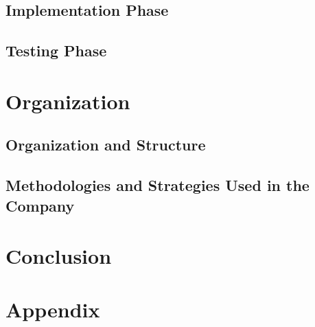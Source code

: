 \documentclass[12pt]{report}
\begin{document}
    \section{Implementation Phase}

    \section{Testing Phase}


\chapter{Organization}

    \section{Organization and Structure}

    \section{Methodologies and Strategies Used in the Company}

\chapter{Conclusion}

\chapter{Appendix}
\end{document}
